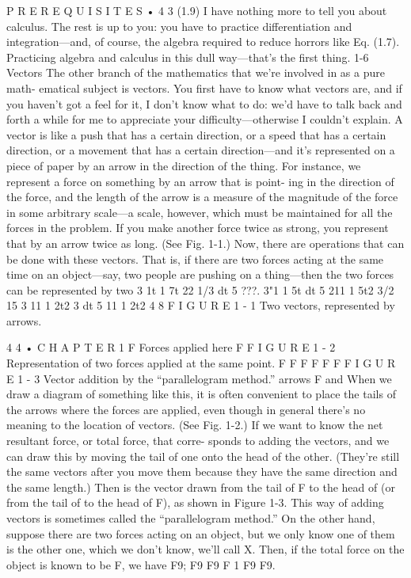 \documentclass[10pt,oneside]{article}
\begin{document}
P R E R E Q U I S I T E S • 4 3 (1.9) I have nothing more to tell you about calculus. The rest is up to you: you have to practice differentiation and integration---and, of course, the algebra required to reduce horrors like Eq. (1.7). Practicing algebra and calculus in this dull way---that’s the first thing. 1-6 Vectors The other branch of the mathematics that we’re involved in as a pure math- ematical subject is vectors. You first have to know what vectors are, and if you haven’t got a feel for it, I don’t know what to do: we’d have to talk back and forth a while for me to appreciate your difficulty---otherwise I couldn’t explain. A vector is like a push that has a certain direction, or a speed that has a certain direction, or a movement that has a certain direction---and it’s represented on a piece of paper by an arrow in the direction of the thing. For instance, we represent a force on something by an arrow that is point- ing in the direction of the force, and the length of the arrow is a measure of the magnitude of the force in some arbitrary scale---a scale, however, which must be maintained for all the forces in the problem. If you make another force twice as strong, you represent that by an arrow twice as long. (See Fig. 1-1.) Now, there are operations that can be done with these vectors. That is, if there are two forces acting at the same time on an object---say, two people are pushing on a thing---then the two forces can be represented by two 3 1t 1 7t 22 1/3 dt 5 ???. 3"1 1 5t dt 5 211 1 5t2 3/2 15 3 11 1 2t2 3 dt 5 11 1 2t2 4 8 F I G U R E 1 - 1 Two vectors, represented by arrows.\par

4 4 • C H A P T E R  1 F Forces applied here F F I G U R E 1 - 2 Representation of two forces applied at the same point. F F F   F F F F I G U R E 1 - 3 Vector addition by the “parallelogram method.” arrows F and When we draw a diagram of something like this, it is often convenient to place the tails of the arrows where the forces are applied, even though in general there’s no meaning to the location of vectors. (See Fig. 1-2.) If we want to know the net resultant force, or total force, that corre- sponds to adding the vectors, and we can draw this by moving the tail of one onto the head of the other. (They’re still the same vectors after you move them because they have the same direction and the same length.) Then is the vector drawn from the tail of F to the head of (or from the tail of to the head of F), as shown in Figure 1-3. This way of adding vectors is sometimes called the “parallelogram method.” On the other hand, suppose there are two forces acting on an object, but we only know one of them is the other one, which we don’t know, we’ll call X. Then, if the total force on the object is known to be F, we have F9; F9 F9 F 1 F9 F9.\par
\end{document}
